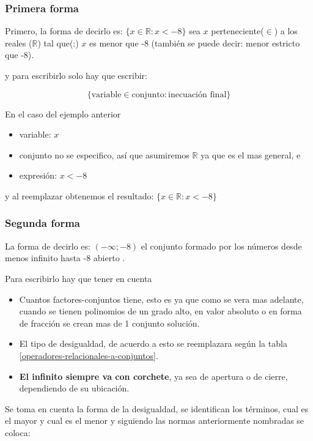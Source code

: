 \documentclass[12pt]{article}
\begin{document}
    \subsubsection*{Primera forma}
    Primero, la forma de decirlo es: $\{x \in \mathbb{R}:x < -8\}$
    sea $x$ perteneciente($\in$) a los reales ($\mathbb{R}$) tal que(:)
    $x$ es menor que -8 (también se puede decir: menor estricto que -8).

    y para escribirlo solo hay que escribir:

    $$ \{ \text{variable} \in \text{conjunto} : \text{inecuación final}  \} $$

    En el caso del ejemplo anterior
   \begin{itemize}
        \item  variable: $x$
        \item conjunto no se especifico, así que asumiremos $\mathbb{R}$ ya que
            es el mas general, e
        \item expresión: $x<-8$
   \end{itemize}

    y al reemplazar obtenemos el resultado: $\{x \in \mathbb{R}:x < -8\}$

    \subsubsection*{Segunda forma} \label{Segunda-forma}
    La forma de decirlo es:  $(-\infty;-8)$ el conjunto formado por los números
    desde menos infinito hasta -8 abierto .

    Para escribirlo hay que tener en cuenta

    \begin{itemize}
        \item Cuantos factores-conjuntos tiene, esto es ya que como se vera mas adelante,
            cuando se tienen polinomios de un grado alto, en valor absoluto o en
            forma de fracción se crean mas de 1 conjunto solución.
        \item El tipo de desigualdad, de acuerdo a esto se reemplazara según la tabla
            \ref{operadores-relacionales-a-conjuntos}.
        \item \textbf{El infinito siempre va con corchete}, ya sea de apertura o de
            cierre, dependiendo de su ubicación.
    \end{itemize}

    Se toma en cuenta la forma de la desigualdad, se identifican los términos, cual
    es el mayor y cual es el menor y siguiendo las normas anteriormente
    nombradas se coloca:
\end{document}
